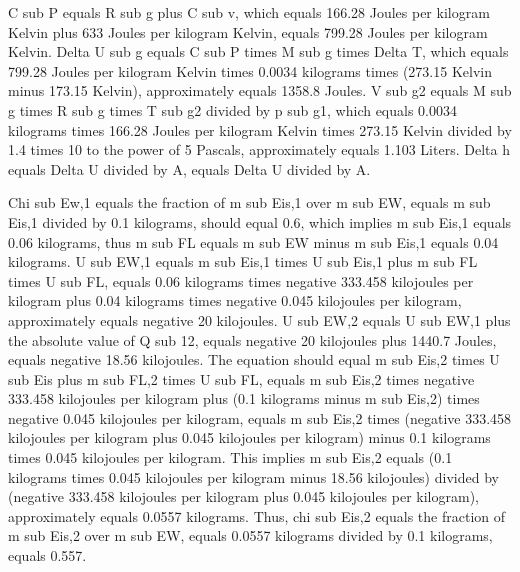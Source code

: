 C sub P equals R sub g plus C sub v, which equals 166.28 Joules per kilogram Kelvin plus 633 Joules per kilogram Kelvin, equals 799.28 Joules per kilogram Kelvin. Delta U sub g equals C sub P times M sub g times Delta T, which equals 799.28 Joules per kilogram Kelvin times 0.0034 kilograms times (273.15 Kelvin minus 173.15 Kelvin), approximately equals 1358.8 Joules. V sub g2 equals M sub g times R sub g times T sub g2 divided by p sub g1, which equals 0.0034 kilograms times 166.28 Joules per kilogram Kelvin times 273.15 Kelvin divided by 1.4 times 10 to the power of 5 Pascals, approximately equals 1.103 Liters. Delta h equals Delta U divided by A, equals Delta U divided by A.

Chi sub Ew,1 equals the fraction of m sub Eis,1 over m sub EW, equals m sub Eis,1 divided by 0.1 kilograms, should equal 0.6, which implies m sub Eis,1 equals 0.06 kilograms, thus m sub FL equals m sub EW minus m sub Eis,1 equals 0.04 kilograms. U sub EW,1 equals m sub Eis,1 times U sub Eis,1 plus m sub FL times U sub FL, equals 0.06 kilograms times negative 333.458 kilojoules per kilogram plus 0.04 kilograms times negative 0.045 kilojoules per kilogram, approximately equals negative 20 kilojoules. U sub EW,2 equals U sub EW,1 plus the absolute value of Q sub 12, equals negative 20 kilojoules plus 1440.7 Joules, equals negative 18.56 kilojoules. The equation should equal m sub Eis,2 times U sub Eis plus m sub FL,2 times U sub FL, equals m sub Eis,2 times negative 333.458 kilojoules per kilogram plus (0.1 kilograms minus m sub Eis,2) times negative 0.045 kilojoules per kilogram, equals m sub Eis,2 times (negative 333.458 kilojoules per kilogram plus 0.045 kilojoules per kilogram) minus 0.1 kilograms times 0.045 kilojoules per kilogram. This implies m sub Eis,2 equals (0.1 kilograms times 0.045 kilojoules per kilogram minus 18.56 kilojoules) divided by (negative 333.458 kilojoules per kilogram plus 0.045 kilojoules per kilogram), approximately equals 0.0557 kilograms. Thus, chi sub Eis,2 equals the fraction of m sub Eis,2 over m sub EW, equals 0.0557 kilograms divided by 0.1 kilograms, equals 0.557.